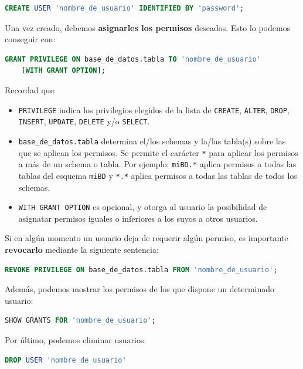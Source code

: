 \documentclass[a4paper]{article}
\begin{document}
\begin{lstlisting}[language=SQL]
CREATE USER 'nombre_de_usuario' IDENTIFIED BY 'password';
\end{lstlisting}

Una vez creado, debemos \textbf{asignarles los permisos} deseados. Esto lo podemos conseguir con:

\begin{lstlisting}[language=SQL]
GRANT PRIVILEGE ON base_de_datos.tabla TO 'nombre_de_usuario' 
    [WITH GRANT OPTION];
\end{lstlisting}

Recordad que:

\begin{itemize}
    \item \texttt{PRIVILEGE} indica los privilegios elegidos de la lista de \texttt{CREATE}, \texttt{ALTER}, \texttt{DROP}, \texttt{INSERT}, \texttt{UPDATE}, \texttt{DELETE} y/o \texttt{SELECT}.
    
    \item \texttt{base\_de\_datos.tabla} determina el/los schemas y la/las tabla(s) sobre las que se aplican los permisos. Se permite el carácter \texttt{*} para aplicar los permisos a más de un schema o tabla. Por ejemplo: \texttt{miBD.*}  aplica permisos a todas las tablas del esquema \texttt{miBD} y \texttt{*.*}  aplica permisos a todas las tablas de todos los schemas.
    
    \item \texttt{WITH GRANT OPTION} es opcional, y otorga al usuario la posibilidad de asignatar permisos iguales o inferiores a los suyos a otros usuarios.
\end{itemize}

Si en algún momento un usuario deja de requerir algún permiso, es importante \textbf{revocarlo} mediante la siguiente sentencia:

\begin{lstlisting}[language=SQL]
REVOKE PRIVILEGE ON base_de_datos.tabla FROM 'nombre_de_usuario';
\end{lstlisting}

Además, podemos mostrar los permisos de los que dispone un determinado usuario:

\begin{lstlisting}[language=SQL]
SHOW GRANTS FOR 'nombre_de_usuario';
\end{lstlisting}

Por último, podemos eliminar usuarios:

\begin{lstlisting}[language=SQL]
DROP USER 'nombre_de_usuario'
\end{lstlisting}
\end{document}
